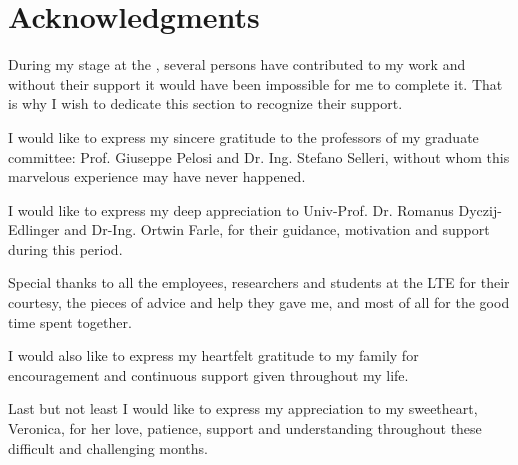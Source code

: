 \cleardoublepage
{}
{}
\chapter*{Acknowledgments}

\par During my stage at the , several persons have contributed to my work and without their support it would have been impossible for me to complete it. That is why I wish to dedicate this section to recognize their support. 

\par I would like to express my sincere gratitude to the professors of my graduate committee: Prof. Giuseppe Pelosi and Dr. Ing. Stefano Selleri, without whom this marvelous experience may have never happened.

\par I would like to express my deep appreciation to Univ-Prof. Dr. Romanus Dyczij-Edlinger and Dr-Ing. Ortwin Farle, for their guidance, motivation and support during this period.

\par Special thanks to all the employees, researchers and students at the LTE for their courtesy, the pieces of advice and help they gave me, and most of all for the good time spent together.

\par I would also like to express my heartfelt gratitude to my family for encouragement and continuous support given throughout my life.

\par Last but not least I would like to express my appreciation to my sweetheart, Veronica, for her love, patience, support and understanding throughout these difficult and challenging months.



